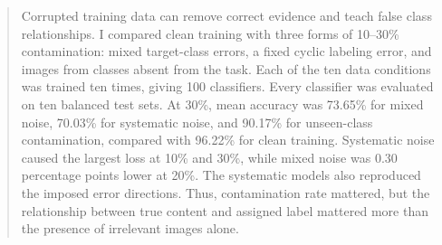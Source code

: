 \begin{abstract}
Corrupted training data can remove correct evidence and teach false class
relationships. I compared clean training with three forms of 10--30\%
contamination: mixed target-class errors, a fixed cyclic labeling error, and
images from classes absent from the task. Each of the ten data conditions was
trained ten times, giving 100 classifiers. Every classifier was evaluated on
ten balanced test sets. At 30\%, mean accuracy was 73.65\% for mixed noise,
70.03\% for systematic noise, and 90.17\% for unseen-class contamination,
compared with 96.22\% for clean training. Systematic noise caused the largest
loss at 10\% and 30\%, while mixed noise was 0.30 percentage points lower at
20\%. The systematic models also reproduced the imposed error directions.
Thus, contamination rate mattered, but the relationship between true content
and assigned label mattered more than the presence of irrelevant images alone.
\end{abstract}
